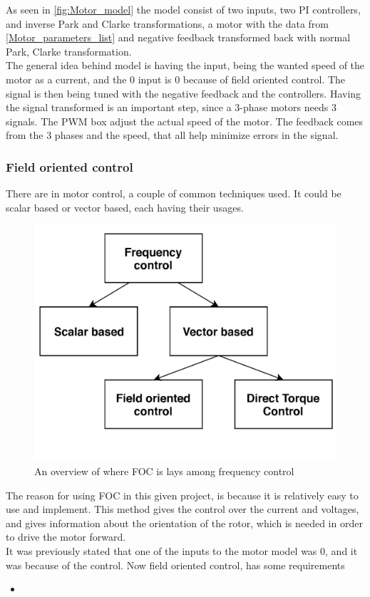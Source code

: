 As seen in \ref{fig:Motor_model} the model consist of two inputs, two PI controllers, and inverse Park and Clarke transformations, a motor with the data from \ref{Motor_parameters_list} and negative feedback transformed back with normal Park, Clarke transformation.\\

The general idea behind model is having the input, being the wanted speed of the motor as a current, and the $0$ input is $0$ because of field oriented control. The signal is then being tuned with the negative feedback and the controllers. Having the signal transformed is an important step, since a 3-phase motors needs 3 signals. The PWM box adjust the actual speed of the motor. The feedback comes from the 3 phases and the speed, that all help minimize errors in the signal. \\

\subsubsection{Field oriented control}
There are in motor control, a couple of common techniques used. It could be scalar based or vector based, each having their usages. \\

\begin{figure}
    \centering
    \includegraphics[scale=0.4]{pictures/control/udklip1.PNG}
    \caption{An overview of where FOC is lays among frequency control}
    \label{fig:my_label}
\end{figure} 

The reason for using FOC in this given project, is because it is relatively easy to use and implement. This method gives the control over the current and voltages, and gives information about the orientation of the rotor, which is needed in order to drive the motor forward. \\

It was previously stated that one of the inputs to the motor model was $0$, and it was because of the control. Now field oriented control, has some requirements 

\begin{itemize}
    \item 
\end{itemize}